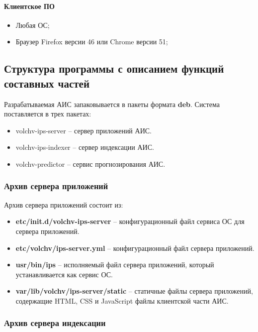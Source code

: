   \paragraph*{Клиентское ПО} \hfill

  \begin{itemize}
  \item Любая ОС;
  \item Браузер Firefox версии 46 или Chrome версии 51;
  \end{itemize}

\subsection{Структура программы с описанием функций составных частей}

Разрабатываемая АИС запаковывается в пакеты формата \textbf{deb}. Система поставляется в трех пакетах:
\begin{itemize}
\item volchv-ips-server -- сервер приложений АИС.
\item volchv-ips-indexer -- сервер индексации АИС.
\item volchv-predictor -- сервис прогнозирования АИС.
\end{itemize}

\subsubsection{Архив сервера приложений}  \hfill

Архив сервера приложений состоит из:
\begin{itemize}
\item \textbf{etc/init.d/volchv-ips-server} -- конфигурационный файл сервиса ОС для сервера приложений. 
\item \textbf{etc/volchv/ips-server.yml} -- конфигурационный файл сервера приложений.
\item \textbf{usr/bin/ips} -- исполняемый файл сервера приложений, который устанавливается как сервис ОС. 
\item \textbf{var/lib/volchv/ips-server/static} -- статичные файлы сервера приложений, содержащие HTML, CSS и JavaScript файлы клиентской части АИС.
\end{itemize}

\subsubsection{Архив сервера индексации} \hfill

